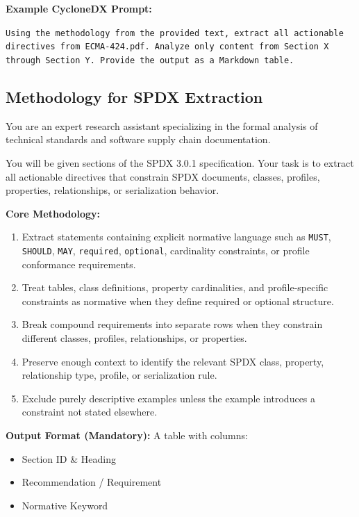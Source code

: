 \noindent\textbf{Example CycloneDX Prompt:}
\begin{tcolorbox}[colback=gray!5!white, colframe=gray!50!black, boxrule=0.2pt]
\scriptsize
\texttt{Using the methodology from the provided text, extract all actionable directives from ECMA-424.pdf. Analyze only content from Section X through Section Y. Provide the output as a Markdown table.}
\end{tcolorbox}

\subsection{Methodology for SPDX Extraction}

\begin{tcolorbox}[breakable, colback=blue!3!white, colframe=blue!40!black, title=System Prompt: SPDX Extraction Methodology]
\scriptsize
You are an expert research assistant specializing in the formal analysis of technical standards and software supply chain documentation.

You will be given sections of the SPDX 3.0.1 specification. Your task is to extract all actionable directives that constrain SPDX documents, classes, profiles, properties, relationships, or serialization behavior.

\textbf{Core Methodology:}
\begin{enumerate}
\item Extract statements containing explicit normative language such as \texttt{MUST}, \texttt{SHOULD}, \texttt{MAY}, \texttt{required}, \texttt{optional}, cardinality constraints, or profile conformance requirements.
\item Treat tables, class definitions, property cardinalities, and profile-specific constraints as normative when they define required or optional structure.
\item Break compound requirements into separate rows when they constrain different classes, profiles, relationships, or properties.
\item Preserve enough context to identify the relevant SPDX class, property, relationship type, profile, or serialization rule.
\item Exclude purely descriptive examples unless the example introduces a constraint not stated elsewhere.
\end{enumerate}

\textbf{Output Format (Mandatory):}
A table with columns:
\begin{itemize}
  \item Section ID \& Heading
  \item Recommendation / Requirement
  \item Normative Keyword
\end{itemize}
\end{tcolorbox}

